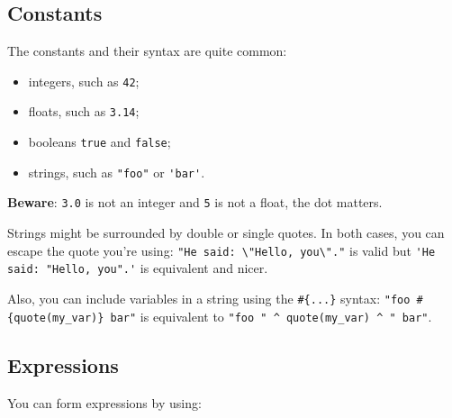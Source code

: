 \subsection{Constants}
The constants and their syntax are quite common:

\begin{itemize}
\item integers, such as \verb+42+;
\item floats, such as \verb+3.14+;
\item booleans \verb+true+ and \verb+false+;
\item strings, such as \verb+"foo"+ or \verb+'bar'+.

\end{itemize}
\textbf{Beware}: \verb+3.0+ is not an integer and \verb+5+ is not a float, the dot matters.

Strings might be surrounded by double or single quotes. In both cases, you can escape the quote you're using: \verb+"He said: \"Hello, you\"."+ is valid but \verb+'He said: "Hello, you".'+ is equivalent and nicer.

Also, you can include variables in a string using the \verb+#{...}+
syntax: 
\verb+"foo #{quote(my_var)} bar"+ is equivalent to
\verb+"foo " ^ quote(my_var) ^ " bar"+.

\subsection{Expressions}
You can form expressions by using:

